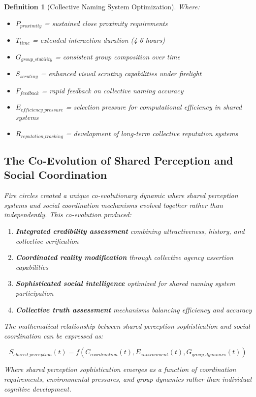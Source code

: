 \documentclass[12pt]{article}
\newtheorem{definition}{Definition}
\begin{document}
\begin{definition}[Collective Naming System Optimization]
Where:
\begin{itemize}
\item $P_{proximity}$ = sustained close proximity requirements
\item $T_{time}$ = extended interaction duration (4-6 hours)
\item $G_{group\_stability}$ = consistent group composition over time
\item $S_{scrutiny}$ = enhanced visual scrutiny capabilities under firelight
\item $F_{feedback}$ = rapid feedback on collective naming accuracy
\item $E_{efficiency\_pressure}$ = selection pressure for computational efficiency in shared systems
\item $R_{reputation\_tracking}$ = development of long-term collective reputation systems
\end{itemize}

\subsection{The Co-Evolution of Shared Perception and Social Coordination}

Fire circles created a unique co-evolutionary dynamic where shared perception systems and social coordination mechanisms evolved together rather than independently. This co-evolution produced:

\begin{enumerate}
\item \textbf{Integrated credibility assessment} combining attractiveness, history, and collective verification
\item \textbf{Coordinated reality modification} through collective agency assertion capabilities
\item \textbf{Sophisticated social intelligence} optimized for shared naming system participation
\item \textbf{Collective truth assessment} mechanisms balancing efficiency and accuracy
\end{enumerate}

The mathematical relationship between shared perception sophistication and social coordination can be expressed as:

$$S_{shared\_perception}(t) = f(C_{coordination}(t), E_{environment}(t), G_{group\_dynamics}(t))$$

Where shared perception sophistication emerges as a function of coordination requirements, environmental pressures, and group dynamics rather than individual cognitive development.


\end{definition}
\end{document}
